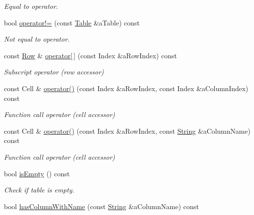 \begin{DoxyCompactItemize}
\begin{DoxyCompactList}\small\item\em Equal to operator. \end{DoxyCompactList}\item 
bool \mbox{\hyperlink{classlibrary_1_1core_1_1ctnr_1_1_table_ab31f43d4e0081b9d3edd03c22115d17b}{operator!=}} (const \mbox{\hyperlink{classlibrary_1_1core_1_1ctnr_1_1_table}{Table}} \&a\+Table) const
\begin{DoxyCompactList}\small\item\em Not equal to operator. \end{DoxyCompactList}\item 
const \mbox{\hyperlink{classlibrary_1_1core_1_1ctnr_1_1table_1_1_row}{Row}} \& \mbox{\hyperlink{classlibrary_1_1core_1_1ctnr_1_1_table_ae0b163e13fe6dc832c103ca7f89a0ca3}{operator\mbox{[}$\,$\mbox{]}}} (const Index \&a\+Row\+Index) const
\begin{DoxyCompactList}\small\item\em Subscript operator (row accessor) \end{DoxyCompactList}\item 
const Cell \& \mbox{\hyperlink{classlibrary_1_1core_1_1ctnr_1_1_table_a4eb003dcbe4c1c127adf473465e70bef}{operator()}} (const Index \&a\+Row\+Index, const Index \&a\+Column\+Index) const
\begin{DoxyCompactList}\small\item\em Function call operator (cell accessor) \end{DoxyCompactList}\item 
const Cell \& \mbox{\hyperlink{classlibrary_1_1core_1_1ctnr_1_1_table_a3176682f6a0762d2290ca82e4318ab56}{operator()}} (const Index \&a\+Row\+Index, const \mbox{\hyperlink{classlibrary_1_1core_1_1types_1_1_string}{String}} \&a\+Column\+Name) const
\begin{DoxyCompactList}\small\item\em Function call operator (cell accessor) \end{DoxyCompactList}\item 
bool \mbox{\hyperlink{classlibrary_1_1core_1_1ctnr_1_1_table_ae0b9f9ee022ed72e06ed41f324855c1a}{is\+Empty}} () const
\begin{DoxyCompactList}\small\item\em Check if table is empty. \end{DoxyCompactList}\item 
bool \mbox{\hyperlink{classlibrary_1_1core_1_1ctnr_1_1_table_a53d1981ce11ba15cc920addfba23e236}{has\+Column\+With\+Name}} (const \mbox{\hyperlink{classlibrary_1_1core_1_1types_1_1_string}{String}} \&a\+Column\+Name) const

\end{DoxyCompactItemize}
